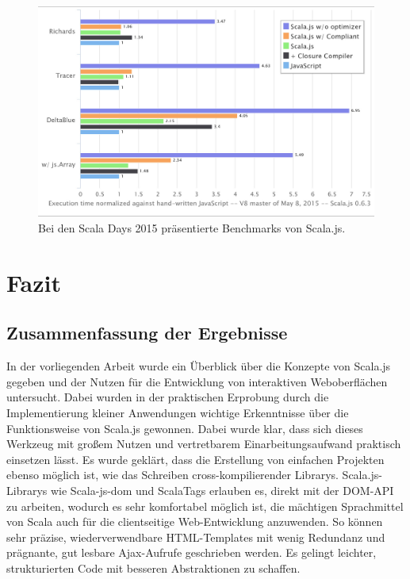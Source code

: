 \documentclass[a4paper, 12pt, hidelinks, listof=totoc, listoftables=totoc, bibliography=totoc]{scrreprt}
\begin{document}
\begin{figure}[!h]
    \centering
    \includegraphics[width=1.0\linewidth]{Doeraene2015-Scalajs-p52}
    \caption[Bei den Scala Days 2015 präsentierte Benchmarks von Scala.js.]{Bei den Scala Days 2015 präsentierte Benchmarks von Scala.js. \cite[Folie 52]{doeraene2015.SSP}}
    \label{fig:doeraene-benchmarks}
\end{figure}





\chapter{Fazit}\label{chap:conclusion}

\section{Zusammenfassung der Ergebnisse}

In der vorliegenden Arbeit wurde ein Überblick über die Konzepte von Scala.js gegeben und der Nutzen für die Entwicklung von interaktiven Weboberflächen untersucht. Dabei wurden in der praktischen Erprobung durch die Implementierung kleiner Anwendungen wichtige Erkenntnisse über die Funktionsweise von Scala.js gewonnen. Dabei wurde klar, dass sich dieses Werkzeug mit großem Nutzen und vertretbarem Einarbeitungsaufwand praktisch einsetzen lässt. Es wurde geklärt, dass die Erstellung von einfachen Projekten ebenso möglich ist, wie das Schreiben cross-kompilierender Librarys. Scala.js-Librarys wie Scala-js-dom und ScalaTags erlauben es, direkt mit der \ac{DOM}-API zu arbeiten, wodurch es sehr komfortabel möglich ist, die mächtigen Sprachmittel von Scala auch für die clientseitige Web-Entwicklung anzuwenden. So können sehr präzise, wiederverwendbare \ac{HTML}-Templates mit wenig Redundanz und prägnante, gut lesbare Ajax-Aufrufe geschrieben werden. Es gelingt leichter, strukturierten Code mit besseren Abstraktionen zu schaffen.
\end{document}
